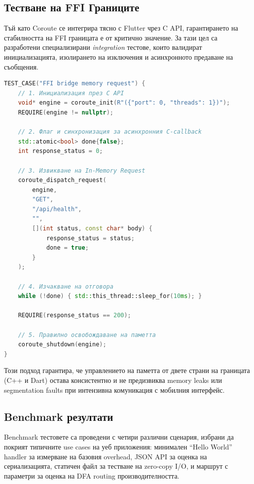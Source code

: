 \subsection{Тестване на FFI Границите}

Тъй като Coroute се интегрира тясно с Flutter чрез C API, гарантирането на стабилността на FFI границата е от критично значение. За тази цел са разработени специализирани \textit{integration} тестове, които валидират инициализацията, изолирането на изключения и асинхронното предаване на съобщения.

\begin{lstlisting}[language=C++, basicstyle=\small\ttfamily, caption={FFI Bridge тест}]
TEST_CASE("FFI bridge memory request") {
    // 1. Инициализация през C API
    void* engine = coroute_init(R"({"port": 0, "threads": 1})");
    REQUIRE(engine != nullptr);
    
    // 2. Флаг и синхронизация за асинхронния C-callback
    std::atomic<bool> done{false};
    int response_status = 0;
    
    // 3. Извикване на In-Memory Request
    coroute_dispatch_request(
        engine, 
        "GET", 
        "/api/health", 
        "", 
        [](int status, const char* body) {
            response_status = status;
            done = true;
        }
    );
    
    // 4. Изчакване на отговора
    while (!done) { std::this_thread::sleep_for(10ms); }
    
    REQUIRE(response_status == 200);
    
    // 5. Правилно освобождаване на паметта
    coroute_shutdown(engine);
}
\end{lstlisting}

Този подход гарантира, че управлението на паметта от двете страни на границата (C++ и Dart) остава консистентно и не предизвиква memory leaks или segmentation faults при интензивна комуникация с мобилния интерфейс.

\subsection{Benchmark резултати}

Benchmark тестовете са проведени с четири различни сценария, избрани да покрият типичните use cases на уеб приложения: минимален ``Hello World'' handler за измерване на базовия overhead, JSON API за оценка на сериализацията, статичен файл за тестване на zero-copy I/O, и маршрут с параметри за оценка на DFA routing производителността.

